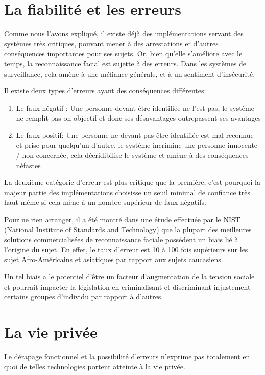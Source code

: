 \section{La fiabilité et les erreurs}
Comme nous l’avons expliqué, il existe déjà des implémentations servant des systèmes très critiques, pouvant
mener à des arrestations et d’autres conséquences importantes pour ses sujets. Or, bien qu’elle s’améliore avec le temps, la reconnaissance facial est sujette à des erreurs. Dans les systèmes de surveillance, cela amène à une
méfiance générale, et à un sentiment d’insécurité. 

Il existe deux types d’erreurs ayant des conséquences différentes:
\begin{enumerate}
\item Le faux négatif : Une personne devant être identifiée ne l’est pas, le système ne remplit pas on objectif et
donc ses désavantages outrepassent ses avantages
\item Le faux positif: Une personne ne devant pas être identifiée est mal reconnue et prise pour quelqu’un
d’autre, le système incrimine une personne innocente / non-concernée, cela décridibilise le système et
amène à des conséquences néfastes
\end{enumerate}

La deuxième catégorie d’erreur est plus critique que la première, c’est pourquoi la majeur partie des
implémentations choisisse un seuil minimal de confiance très haut même si cela mène à un nombre supérieur de
faux négatifs.

Pour ne rien arranger, il a été montré dans une étude effectuée par le NIST (National Institute of Standards and
Technology) que la plupart des meilleures solutions commercialisées de reconnaissance faciale possédent un biais
lié à l’origine du sujet. En effet, le taux d’erreur est 10 à 100 fois supérieurs sur les sujet Afro-Américains et
asiatiques par rapport aux sujets caucasiens.

Un tel biais a le potentiel d’être un facteur d’augmentation de la tension sociale et pourrait impacter la législation
en criminalisant et discriminant injustement certains groupes d’individu par rapport à d’autres.

\section{La vie privée}
Le dérapage fonctionnel et la possibilité d’erreurs n’exprime pas totalement en quoi de telles technologies portent
atteinte à la vie privée.


